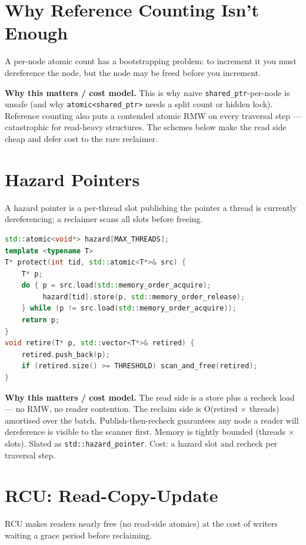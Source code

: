 \section{Why Reference Counting Isn't Enough}
A per-node atomic count has a bootstrapping problem: to increment it you must dereference the node, but the node may be freed before you increment.

\textbf{Why this matters / cost model.} This is why naive \texttt{shared\_ptr}-per-node is unsafe (and why \texttt{atomic<shared\_ptr>} needs a split count or hidden lock). Reference counting also puts a contended atomic RMW on every traversal step --- catastrophic for read-heavy structures. The schemes below make the read side cheap and defer cost to the rare reclaimer.

\section{Hazard Pointers}
A hazard pointer is a per-thread slot publishing the pointer a thread is currently dereferencing; a reclaimer scans all slots before freeing.

\begin{lstlisting}[language=C++, caption={Hazard pointers: publish-then-recheck; scan-before-free. Min standard: C++11.}]
std::atomic<void*> hazard[MAX_THREADS];
template <typename T>
T* protect(int tid, std::atomic<T*>& src) {
    T* p;
    do { p = src.load(std::memory_order_acquire);
         hazard[tid].store(p, std::memory_order_release);
    } while (p != src.load(std::memory_order_acquire));
    return p;
}
void retire(T* p, std::vector<T*>& retired) {
    retired.push_back(p);
    if (retired.size() >= THRESHOLD) scan_and_free(retired);
}
\end{lstlisting}

\textbf{Why this matters / cost model.} The read side is a store plus a recheck load --- no RMW, no reader contention. The reclaim side is O(retired $\times$ threads) amortised over the batch. Publish-then-recheck guarantees any node a reader will dereference is visible to the scanner first. Memory is tightly bounded (threads $\times$ slots). Slated as \texttt{std::hazard\_pointer}. Cost: a hazard slot and recheck per traversal step.

\section{RCU: Read-Copy-Update}
RCU makes readers nearly free (no read-side atomics) at the cost of writers waiting a grace period before reclaiming.

